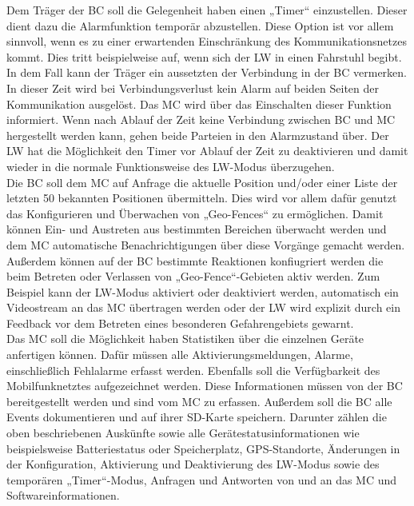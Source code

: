 \documentclass[thesis.tex]{subfiles}
\begin{document}
Dem Träger der BC soll die Gelegenheit haben einen „Timer“ einzustellen.
Dieser dient dazu die Alarmfunktion temporär abzustellen.
Diese Option ist vor allem sinnvoll, wenn es zu einer erwartenden Einschränkung des Kommunikationsnetzes kommt.
Dies tritt beispielweise auf, wenn sich der LW in einen Fahrstuhl begibt.
In dem Fall kann der Träger ein aussetzten der Verbindung in der BC vermerken.
In dieser Zeit wird bei Verbindungsverlust kein Alarm auf beiden Seiten der Kommunikation ausgelöst.
Das MC wird über das Einschalten dieser Funktion informiert.
Wenn nach Ablauf der Zeit keine Verbindung zwischen BC und MC hergestellt werden kann, gehen beide Parteien in den Alarmzustand über.
Der LW hat die Möglichkeit den Timer vor Ablauf der Zeit zu deaktivieren und damit wieder in die normale Funktionsweise des LW-Modus überzugehen.
\\

Die BC soll dem MC auf Anfrage die aktuelle Position und/oder einer Liste der letzten 50 bekannten Positionen übermitteln.
Dies wird vor allem dafür genutzt das Konfigurieren und Überwachen von „Geo-Fences“ zu ermöglichen.
Damit können Ein- und Austreten aus bestimmten Bereichen überwacht werden und dem MC automatische Benachrichtigungen
über diese Vorgänge gemacht werden.
Außerdem können auf der BC bestimmte Reaktionen konfiugriert werden die beim Betreten oder Verlassen von „Geo-Fence“-Gebieten aktiv werden.
Zum Beispiel kann der LW-Modus aktiviert oder deaktiviert werden, automatisch ein Videostream an das MC übertragen werden
oder der LW wird explizit durch ein Feedback vor dem Betreten eines besonderen Gefahrengebiets gewarnt.
\\

Das MC soll die Möglichkeit haben Statistiken über die einzelnen Geräte anfertigen können.
Dafür müssen alle Aktivierungsmeldungen, Alarme, einschließlich Fehlalarme erfasst werden.
Ebenfalls soll die Verfügbarkeit des Mobilfunknetztes aufgezeichnet werden.
Diese Informationen müssen von der BC bereitgestellt werden und sind vom MC zu erfassen.
Außerdem soll die BC alle Events dokumentieren und auf ihrer SD-Karte speichern.
Darunter zählen die oben beschriebenen Auskünfte sowie alle Gerätestatusinformationen wie beispielsweise Batteriestatus
oder Speicherplatz, GPS-Standorte, Änderungen in der Konfiguration, Aktivierung und Deaktivierung des LW-Modus
sowie des temporären „Timer“-Modus, Anfragen und Antworten von und an das MC und Softwareinformationen.
\\
\end{document}
